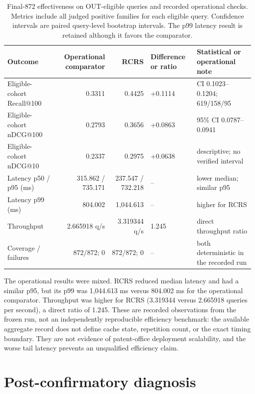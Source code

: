 \documentclass[final,5p,times,twocolumn]{elsarticle}
\newcommand{\RCRS}{RCRS}
\newenvironment{widejournal}{\begin{table}[!t]}{\end{table}}
\newenvironment{widejournal}{\begin{table}[!htbp]}{\end{table}}
\begin{document}
\begin{widejournal}
\caption{Final-872 effectiveness on OUT-eligible queries and recorded
operational checks. Metrics include all judged positive families for each
eligible query. Confidence intervals are paired query-level bootstrap intervals. The p99 latency result is retained
although it favors the comparator.}
\label{tab:final}
\centering
\scriptsize
\renewcommand{\arraystretch}{0.90}
\begin{tabularx}{\textwidth}{@{}P{2.4cm}r r P{1.5cm}Y@{}}
\toprule
Outcome & Operational comparator & \RCRS{} & Difference or ratio & Statistical or operational note \\
\midrule
Eligible-cohort Recall@100 & 0.3311 & 0.4425 & +0.1114 &
CI 0.1023--0.1204; 619/158/95 \\
Eligible-cohort nDCG@100 & 0.2793 & 0.3656 & +0.0863 &
95\% CI 0.0787--0.0941 \\
Eligible-cohort nDCG@10 & 0.2337 & 0.2975 & +0.0638 &
descriptive; no verified interval \\
Latency p50 / p95 (ms) & 315.862 / 735.171 & 237.547 / 732.218 & -- &
lower median; similar p95 \\
Latency p99 (ms) & 804.002 & 1,044.613 & -- & higher for \RCRS{} \\
Throughput & 2.665918 q/s & 3.319344 q/s & 1.245 &
direct throughput ratio \\
Coverage / failures & 872/872; 0 & 872/872; 0 & -- &
both deterministic in the recorded run \\
\bottomrule
\end{tabularx}
\end{widejournal}

The operational results were mixed. \RCRS{} reduced median latency and had a
similar p95, but its p99 was 1,044.613 ms versus 804.002 ms for the operational
comparator. Throughput was higher for \RCRS{} (3.319344 versus 2.665918 queries
per second), a direct ratio of 1.245. These are recorded observations from the
frozen run, not an independently reproducible efficiency benchmark: the
available aggregate record does not define cache state, repetition count, or
the exact timing boundary. They are not evidence of patent-office deployment
scalability, and the worse tail latency prevents an unqualified efficiency
claim.

\section{Post-confirmatory diagnosis}
\end{document}
